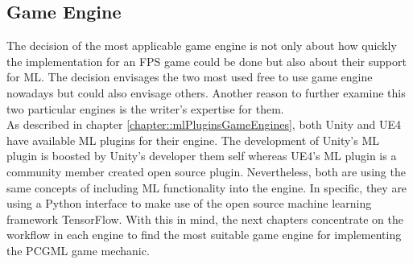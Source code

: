 \documentclass[MGS,Master,english]{twbook}%
\begin{document}
\subsection{Game Engine}
The decision of the most applicable game engine is not only about how quickly the implementation for an FPS game could be done but also about their support for ML. The decision envisages the two most used free to use game engine nowadays but could also envisage others. Another reason to further examine this two particular engines is the writer's expertise for them.\\
As described in chapter \ref{chapter::mlPluginsGameEngines}, both Unity and UE4 have available ML plugins for their engine. The development of Unity's ML plugin is boosted by Unity's developer them self whereas UE4's ML plugin is a community member created open source plugin. Nevertheless, both are using the same concepts of including ML functionality into the engine. In specific, they are using a Python interface to make use of the open source machine learning framework TensorFlow. With this in mind, the next chapters concentrate on the workflow in each engine to find the most suitable game engine for implementing the PCGML game mechanic.
\end{document}
